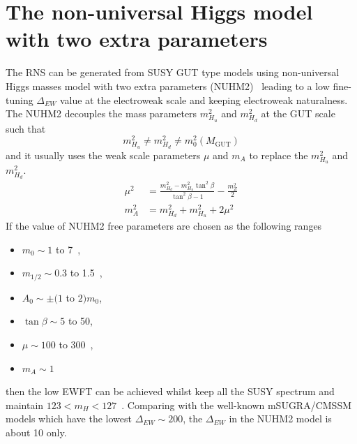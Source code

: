 \section{The non-universal Higgs model with two extra parameters}
\label{sec:susy_nuhm2}
The RNS can be generated from SUSY GUT type models using non-universal Higgs masses model with two extra parameters (NUHM2)~\cite{Ellis:2002wv, Ellis:2002iu, Baer:2004fu, Baer:2005bu} leading to a low fine-tuning $\Delta_{EW}$ value at the electroweak scale and keeping electroweak naturalness.
The NUHM2 decouples the mass parameters $m^{2}_{H_{u}}$ and $m^{2}_{H_{d}}$ at the GUT scale such that
%
\begin{equation}
    m^{2}_{H_{u}} \neq m^{2}_{H_{d}} \neq m^{2}_{0}(M_{\text{GUT}})
    \label{eq:susy_nuhm2_decouple}
\end{equation}
%
and it usually uses the weak scale parameters $\mu$ and $m_{A}$ to replace the $m^{2}_{H_{u}}$ and $m^{2}_{H_{d}}$.
%
\begin{align}
    \mu^{2} &= \frac{m^{2}_{H_{d}} - m^{2}_{H_{u}}\tan^{2}\beta}{\tan^{2}\beta - 1} - \frac{m^{2}_{Z}}{2}\\
    m^{2}_{A} &= m^{2}_{H_{d}} + m^{2}_{H_{u}} + 2\mu^{2}
    \label{eq:susy_weak_scale_parameters}
\end{align}
%
If the value of NUHM2 free parameters are chosen as the following ranges
%
\begin{itemize}
    \item $m_{0} \sim 1$ to 7~{\TeV},
    \item $m_{1/2} \sim 0.3$ to 1.5~{\TeV},
    \item $A_{0} \sim \pm(1$ to $2) m_{0}$,
    \item $\tan\beta \sim 5$ to 50,
    \item $\mu \sim 100$ to 300~{\GeV},
    \item $m_{A} \sim 1$~{\GeV}
\end{itemize}
%
then the low EWFT can be achieved whilst keep all the SUSY spectrum and maintain $123 < m_{H} < 127$~{\GeV}.
Comparing with the well-known mSUGRA/CMSSM models which have the lowest $\Delta_{EW} \sim 200$, the $\Delta_{EW}$ in the NUHM2 model is about 10 only.
